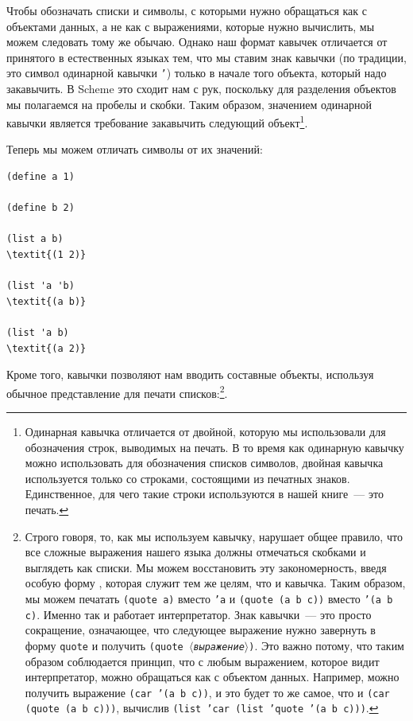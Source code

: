 Чтобы обозначать списки и символы, с которыми нужно
обращаться как с объектами данных, а не как с выражениями, которые
нужно вычислить, мы можем следовать тому же обычаю.  Однако наш
формат кавычек отличается от принятого в естественных языках тем, что мы ставим
знак кавычки (по традиции, это символ одинарной кавычки
{\tt '}) только в начале того объекта, который надо
закавычить.  В Scheme это сходит нам с рук, поскольку для разделения
объектов мы полагаемся на пробелы и скобки.  Таким образом, значением
одинарной кавычки является требование закавычить следующий
объект\footnote{Одинарная
кавычка отличается от двойной, которую мы
использовали для обозначения
строк, выводимых на печать.  В то 
время как одинарную кавычку можно использовать для обозначения списков 
символов, двойная кавычка используется только со  строками, состоящими
из печатных знаков.  Единственное, для чего такие строки используются в 
нашей книге~--- это печать.}.

 Теперь мы можем отличать символы от их значений:

\begin{Verbatim}[fontsize=\small]
(define a 1)

(define b 2)

(list a b)
\textit{(1 2)}

(list 'a 'b)
\textit{(a b)}

(list 'a b)
\textit{(a 2)}
\end{Verbatim}

Кроме того, кавычки позволяют нам вводить составные
объекты, используя обычное представление для печати списков:\footnote{Строго говоря, то, как мы используем кавычку, нарушает
общее правило, что все сложные выражения нашего языка должны
отмечаться скобками и выглядеть как списки.  Мы можем восстановить эту 
закономерность, введя особую форму  , которая
служит тем же целям, что и кавычка.  Таким образом, мы можем печатать
{\tt (quote a)} вместо {\tt 'a} и {\tt (quote (a b
c))} вместо {\tt '(a b c)}. Именно так и работает
интерпретатор.  Знак кавычки~--- это просто сокращение, означающее,
что следующее выражение нужно завернуть в форму {\tt quote} и
получить {\tt (quote \textit{$\langle$выражение$\rangle$})}.  Это важно
потому, что таким образом соблюдается принцип, что с любым выражением,
которое видит интерпретатор, можно обращаться как с объектом
данных. Например, можно получить выражение {\tt (car '(a b
c))}, и это будет то же самое, что и {\tt (car (quote (a b
c)))}, вычислив {\tt (list 'car (list 'quote '(a b c)))}.}.


